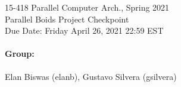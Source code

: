 \documentclass[12pt]{article}
\begin{document}
\begin{centering}
    {\large 15-418 Parallel Computer Arch., Spring 2021\\}
    \vspace{2ex}
    {\LARGE Parallel Boids Project Checkpoint\\}
    \vspace{2ex}
    {\large Due Date: Friday April 26, 2021 22:59 EST\\}
\end{centering}

\bigskip

\paragraph{Group:} Elan Biswas (elanb), Gustavo Silvera (gsilvera)
\end{document}
